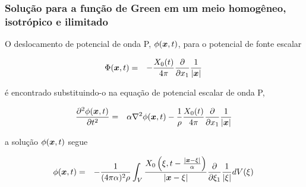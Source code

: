 \documentclass{beamer}
\newcommand{\xvec}{\vc{x}}
\newcommand{\xivec}{\boldmath \xi}
\begin{document}
\begin{frame}
	\frametitle{\textbf{Solu\c{c}\~ao para a fun\c{c}\~ao de Green em um meio homog\^eneo, isotr\'opico e ilimitado}}
	
	\begin{flushleft}
		O deslocamento de potencial de onda P, $\phi(\xvec,t)$, para o potencial de fonte escalar 
	\end{flushleft}
	\begin{eqnarray}
	\label{ten1}
	\Phi(\xvec,t) &=& - \frac{X_{0}(t)}{4\pi} \frac{\partial }{\partial x_1} \frac{1}{\left| \xvec \right|} \, 
	\end{eqnarray}
	
	\begin{flushleft} 
		\'e encontrado substituindo-o na equa\c{c}\~ao de potencial escalar de onda P,
	\end{flushleft}
	\begin{eqnarray}
	\label{ten1}
	\frac{\partial^2 \phi(\xvec,t)}{\partial t^2} &=& \alpha \nabla^2 \phi(\xvec,t) - \frac{1}{\rho}\frac{X_{0}(t)}{4\pi} \frac{\partial }{\partial x_1} \frac{1}{\left| \xvec \right|} \,       
	\end{eqnarray}
	\begin{flushleft}
		a solu\c{c}\~ao $\phi(\xvec,t)$ segue
	\end{flushleft}
	\begin{eqnarray}
	\label{ten1}
	\phi(\xvec,t) &=& - \frac{1}{(4\pi\alpha)^{2} \rho} \int_{V} \frac{ X_{0} \left( \xivec,t - \frac{\left|\xvec - \xivec \right|}{\alpha}  \right) }{\left|\xvec - \xivec \right|} \frac{\partial }{\partial \xi_1} \frac{1}{\left| \xivec \right|} dV(\xivec)\,       
	\end{eqnarray}
	
	
\end{frame}%
\end{document}
